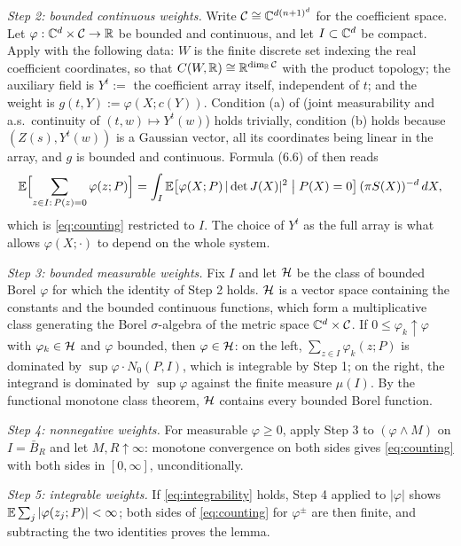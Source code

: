 \emph{Step 2: bounded continuous weights.} Write $\mathcal{C}\cong\mathbb{C}^{d(n+1)^d}$ for the
coefficient space. Let $\varphi:\mathbb{C}^d\times\mathcal{C}\to\mathbb{R}$ be bounded and continuous, and let
$I\subset\mathbb{C}^d$ be compact. Apply \cite[Thm.~6.4]{azais2009level} with the following data:
$W$ is the finite discrete set indexing the real coefficient coordinates, so that
$C(W,\mathbb{R})\cong\mathbb{R}^{\dim_{\mathbb{R}}\mathcal{C}}$ with the product topology; the auxiliary field is $Y^t := $ the coefficient array itself,
independent of $t$; and the weight is $g(t,Y):=\varphi(X;c(Y))$. Condition (a) of
\cite[Thm.~6.4]{azais2009level} (joint measurability and a.s.\ continuity of
$(t,w)\mapsto Y^t(w)$) holds trivially, condition (b) holds because
$(Z(s),Y^t(w))$ is a Gaussian vector, all its coordinates being linear in the array, and
$g$ is bounded and continuous. Formula (6.6) of \cite{azais2009level} then reads
\[
  \mathbb{E}\Bigl[\sum_{z\in I:\,P(z)=0}\varphi(z;P)\Bigr]
  = \int_I\mathbb{E}\bigl[\varphi(X;P)\,|\det J(X)|^2 \bigm| P(X)=0\bigr]\,(\pi S(X))^{-d}\,dX,
\]
which is \eqref{eq:counting} restricted to $I$. The choice of $Y^t$ as the full array is
what allows $\varphi(X;\cdot)$ to depend on the whole system.

\emph{Step 3: bounded measurable weights.} Fix $I$ and let $\mathcal{H}$ be the class of bounded
Borel $\varphi$ for which the identity of Step 2 holds. $\mathcal{H}$ is a vector space
containing the constants and the bounded continuous functions, which form a multiplicative
class generating the Borel $\sigma$-algebra of the metric space $\mathbb{C}^d\times\mathcal{C}$. If
$0\le\varphi_k\uparrow\varphi$ with $\varphi_k\in\mathcal{H}$ and $\varphi$ bounded, then
$\varphi\in\mathcal{H}$: on the left, $\sum_{z\in I}\varphi_k(z;P)$ is dominated by
$\sup\varphi\cdot N_0(P,I)$, which is integrable by Step 1; on the right, the integrand is
dominated by $\sup\varphi$ against the finite measure $\mu(I)$. By the functional monotone
class theorem, $\mathcal{H}$ contains every bounded Borel function.

\emph{Step 4: nonnegative weights.} For measurable $\varphi\ge0$, apply Step 3 to
$(\varphi\wedge M)$ on $I=\bar B_R$ and let $M,R\uparrow\infty$: monotone convergence on
both sides gives \eqref{eq:counting} with both sides in $[0,\infty]$, unconditionally.

\emph{Step 5: integrable weights.} If \eqref{eq:integrability} holds, Step 4 applied to
$|\varphi|$ shows $\mathbb{E}\sum_j|\varphi(z_j;P)|<\infty$; both sides of \eqref{eq:counting} for
$\varphi^\pm$ are then finite, and subtracting the two identities proves the lemma.
\endproof

